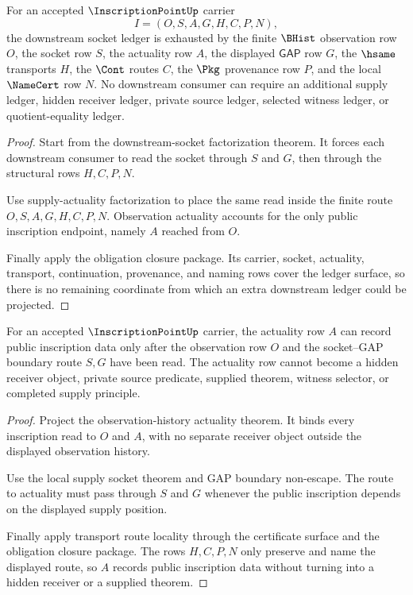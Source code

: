 \begin{theorem}
\label{thm:inscription-point-socket-ledger-exhaustion}
For an accepted $\InscriptionPointUp$ carrier
$$
I=(O,S,A,G,H,C,P,N),
$$
the downstream socket ledger is exhausted by the finite $\BHist$ observation row $O$, the socket row $S$, the actuality row $A$, the displayed $\mathsf{GAP}$ row $G$, the $\hsame$ transports $H$, the $\Cont$ routes $C$, the $\Pkg$ provenance row $P$, and the local $\NameCert$ row $N$. No downstream consumer can require an additional supply ledger, hidden receiver ledger, private source ledger, selected witness ledger, or quotient-equality ledger.
\end{theorem}
\begin{proof}
Start from the downstream-socket factorization theorem. It forces each downstream consumer to read the socket through $S$ and $G$, then through the structural rows $H,C,P,N$.

Use supply-actuality factorization to place the same read inside the finite route $O,S,A,G,H,C,P,N$. Observation actuality accounts for the only public inscription endpoint, namely $A$ reached from $O$.

Finally apply the obligation closure package. Its carrier, socket, actuality, transport, continuation, provenance, and naming rows cover the ledger surface, so there is no remaining coordinate from which an extra downstream ledger could be projected.
\end{proof}

\begin{theorem}
\label{thm:inscription-point-actuality-nonescape}
For an accepted $\InscriptionPointUp$ carrier, the actuality row $A$ can record public inscription data only after the observation row $O$ and the socket--GAP boundary route $S,G$ have been read. The actuality row cannot become a hidden receiver object, private source predicate, supplied theorem, witness selector, or completed supply principle.
\end{theorem}
\begin{proof}
Project the observation-history actuality theorem. It binds every inscription read to $O$ and $A$, with no separate receiver object outside the displayed observation history.

Use the local supply socket theorem and GAP boundary non-escape. The route to actuality must pass through $S$ and $G$ whenever the public inscription depends on the displayed supply position.

Finally apply transport route locality through the certificate surface and the obligation closure package. The rows $H,C,P,N$ only preserve and name the displayed route, so $A$ records public inscription data without turning into a hidden receiver or a supplied theorem.
\end{proof}

